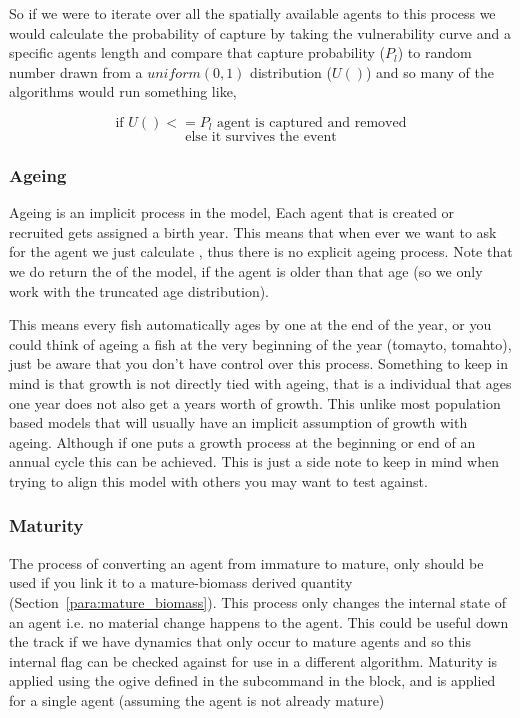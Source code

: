 So if we were to iterate over all the spatially available agents to this process we would calculate the probability of capture by taking the vulnerability curve and a specific agents length and compare that capture probability ($P_l$) to random number drawn from a $uniform(0,1)$ distribution ($U()$) and so many of the algorithms would run something like,

$$ \text{if }U() <= P_l \text{ agent is captured and removed}$$
$$ \text{else it survives the event}$$

\subsubsection{Ageing}

Ageing is an implicit process in the model, Each agent that is created or recruited gets assigned a birth year. This means that when ever we want to ask for the agent we just calculate , thus there is no explicit ageing process. Note that we do return the  of the model, if the agent is older than that age (so we only work with the truncated age distribution).


This means every fish automatically ages by one at the end of the year, or you could think of ageing a fish at the very beginning of the year (tomayto, tomahto), just be aware that you don't have control over this process. Something to keep in mind is that growth is not directly tied with ageing, that is a individual that ages one year does not also get a years worth of growth. This unlike most population based models that will usually have an implicit assumption of growth with ageing. Although if one puts a growth process at the beginning or end of an annual cycle this can be achieved. This is just a side note to keep in mind when trying to align this model with others you may want to test against.


\subsubsection{Maturity}\label{subsubsec:maturity}
The process of converting an agent from immature to mature, only should be used if you link it to a mature-biomass derived quantity (Section~\ref{para:mature_biomass}). This process only changes the internal state of an agent i.e. no material change happens to the agent. This could be useful down the track if we have dynamics that only occur to mature agents and so this internal flag can be checked against for use in a different algorithm. Maturity is applied using the ogive defined in the subcommand  in the  block, and is applied for a single agent (assuming the agent is not already mature)

